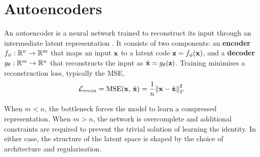 
\section{Autoencoders} \label{sec:background:ae}

An autoencoder is a neural network trained to reconstruct its input through an
intermediate latent representation \cite[Ch 14]{goodfellowDeepLearning2016}. It
consists of two components: an \textbf{encoder} $f_{\phi}: \mathbb{R}^{n} \rightarrow
\mathbb{R}^{m}$ that maps an input $\vb{x}$ to a latent code $\vb{z} =
f_{\phi}(\vb{x})$, and a \textbf{decoder} $g_{\theta}: \mathbb{R}^{m} \rightarrow
\mathbb{R}^{n}$ that reconstructs the input as $\hat{\vb{x}} = g_{\theta}(\vb{z})$.
Training minimises a reconstruction loss, typically the \ac{MSE},
\begin{equation} \label{eq:background:ae:recon-loss}
    \mathcal{L}_{\mathrm{recon}}
    = \operatorname{MSE}(\vb{x}, \,\hat{\vb{x}})
    = \frac{1}{n} \norm{\vb{x} - \hat{\vb{x}}}^{2}_{2}.
\end{equation}

When $m < n$, the bottleneck forces the model to learn a compressed
representation. When $m > n$, the network is overcomplete and additional
constraints are required to prevent the trivial solution of learning the
identity. In either case, the structure of the latent space is shaped by the
choice of architecture and regularisation.


